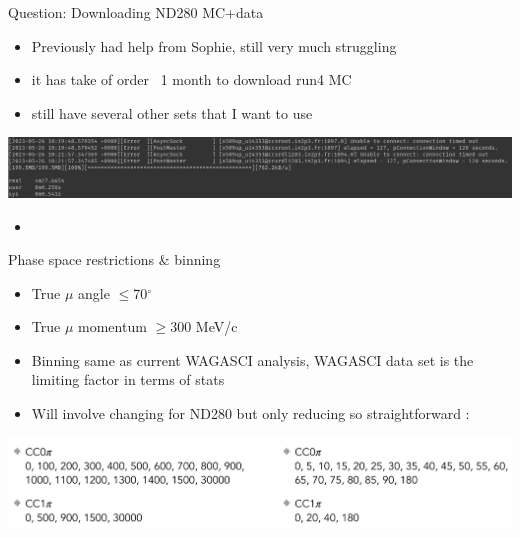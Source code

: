 \documentclass{beamer}
\begin{document}
\begin{frame}{Question: Downloading ND280 MC+data}
    \begin{itemize}
        \item Previously had help from Sophie, still very much struggling 
        \item it has take of order ~1 month to download run4 MC
        \item still have several other sets that I want to use
    \end{itemize}
    \includegraphics[width=\textwidth]{images/download_grid.png}
    \begin{itemize}
        \item \color{red}{Resolved: Using directory sync tools}
    \end{itemize}
\end{frame}





\begin{frame}{Phase space restrictions \& binning}

\begin{itemize}
    \item True $\mu$ angle $\leq$70$^\circ$
    \item True $\mu$ momentum $\geq$300 MeV/c
    \item Binning same as current WAGASCI analysis, WAGASCI data set is the limiting factor in terms of stats
    \item Will involve changing for ND280 but only reducing so straightforward : \color{red}{Done}
\end{itemize}    
\includegraphics[width=\textwidth]{images/binning.png}
\end{frame}
\end{document}
